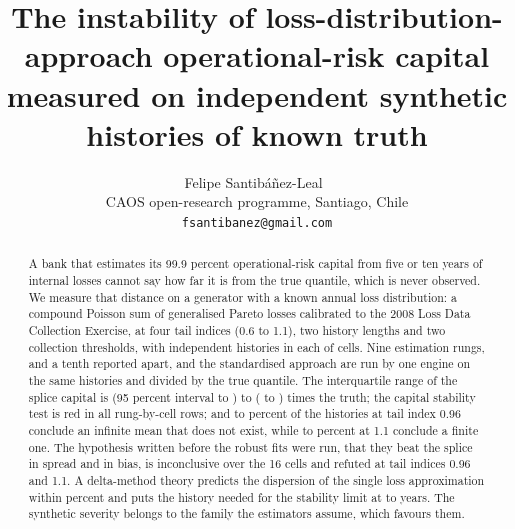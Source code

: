 \documentclass[11pt]{article}
\title{The instability of loss-distribution-approach operational-risk capital measured on independent synthetic histories of known truth}
\author{Felipe Santib\'a\~nez-Leal~\orcidlink{0000-0002-0150-3246}\\
\small CAOS open-research programme, Santiago, Chile\\
\small \texttt{fsantibanez@gmail.com}}
\date{\docdate}
\begin{document}
\maketitle
\headerblock

\begin{abstract}
A bank that estimates its 99.9 percent operational-risk capital from five or ten years of internal losses cannot say how far it is
from the true quantile, which is never observed. We measure that distance on a generator with a known annual loss distribution:
a compound Poisson sum of generalised Pareto losses calibrated to the 2008 Loss Data Collection Exercise, at four tail indices (0.6 to 1.1),
two history lengths and two collection thresholds, with \nPer{} independent histories in each of \nCells{} cells. Nine estimation rungs, and a tenth reported apart, and
the standardised approach are run by one engine on the same histories and divided by the true quantile. The interquartile range of the
splice capital is \spIqrMin{} (95 percent interval \spMinLo{} to \spMinHi{}) to \spIqrMax{} (\spMaxLo{} to \spMaxHi{}) times the
truth; the capital stability test is red in all \redTotal{} rung-by-cell rows; and \infLo{} to \infHi{} percent of the histories at tail index 0.96
conclude an infinite mean that does not exist, while \finLo{} to \finHi{} percent at 1.1 conclude a finite one. The hypothesis written
before the robust fits were run, that they beat the splice in spread and in bias, is inconclusive over the 16 cells and refuted at tail
indices 0.96 and 1.1. A delta-method theory predicts the dispersion of the single loss approximation within \thSdMaxErr{} percent and puts the
history needed for the stability limit at \yrsMin{} to \yrsMax{} years. The synthetic severity belongs to the family the estimators assume, which favours them.
\end{abstract}
















\end{document}

